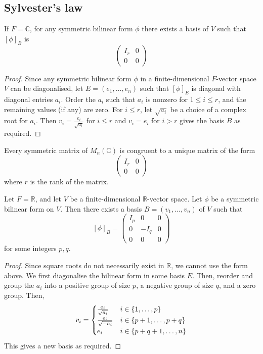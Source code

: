 \subsection{Sylvester's law}
\begin{corollary}
	If \( F = \mathbb C \), for any symmetric bilinear form \( \phi \) there exists a basis of \( V \) such that \( [\phi]_B \) is
	\[
		\begin{pmatrix}
			I_r & 0 \\
			0   & 0
		\end{pmatrix}
	\]
\end{corollary}
\begin{proof}
	Since any symmetric bilinear form \( \phi \) in a finite-dimensional \( F \)-vector space \( V \) can be diagonalised, let \( E = (e_1, \dots, e_n) \) such that \( [\phi]_E \) is diagonal with diagonal entries \( a_i \).
	Order the \( a_i \) such that \( a_i \) is nonzero for \( 1 \leq i \leq r \), and the remaining values (if any) are zero.
	For \( i \leq r \), let \( \sqrt{a_i} \) be a choice of a complex root for \( a_i \).
	Then \( v_i = \frac{e_i}{\sqrt{a_i}} \) for \( i \leq r \) and \( v_i = e_i \) for \( i > r \) gives the basis \( B \) as required.
\end{proof}
\begin{corollary}
	Every symmetric matrix of \( M_n(\mathbb C) \) is congruent to a unique matrix of the form
	\[
		\begin{pmatrix}
			I_r & 0 \\
			0   & 0
		\end{pmatrix}
	\]
	where \( r \) is the rank of the matrix.
\end{corollary}
\begin{corollary}
	Let \( F = \mathbb R \), and let \( V \) be a finite-dimensional \( \mathbb R \)-vector space.
	Let \( \phi \) be a symmetric bilinear form on \( V \).
	Then there exists a basis \( B = (v_1, \dots, v_n) \) of \( V \) such that
	\[
		[\phi]_B = \begin{pmatrix}
			I_p & 0    & 0 \\
			0   & -I_q & 0 \\
			0   & 0    & 0
		\end{pmatrix}
	\]
	for some integers \( p, q \).
\end{corollary}
\begin{proof}
	Since square roots do not necessarily exist in \( \mathbb R \), we cannot use the form above.
	We first diagonalise the bilinear form in some basis \( E \).
	Then, reorder and group the \( a_i \) into a positive group of size \( p \), a negative group of size \( q \), and a zero group.
	Then,
	\[
		v_i = \begin{cases}
			\frac{e_i}{\sqrt{a_i}}  & i \in \qty{1, \dots, p}     \\
			\frac{e_i}{\sqrt{-a_i}} & i \in \qty{p+1, \dots, p+q} \\
			e_i                     & i \in \qty{p+q+1, \dots, n}
		\end{cases}
	\]
	This gives a new basis as required.
\end{proof}
